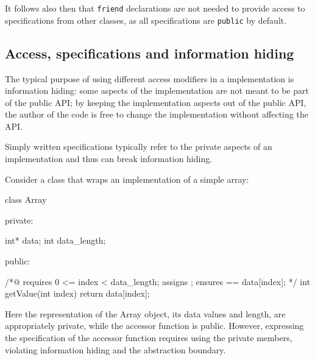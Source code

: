 It follows also then that \lstinline|friend| declarations are not 
needed to provide access to \NAME specifications from other classes,
as all specifications are \lstinline|public| by default.
 
\subsection{Access, specifications and information hiding}

The typical purpose of using different access modifiers in a
\lang implementation is information hiding: some aspects of
the implementation are not meant to be part of the public API;
by keeping the implementation aspects out of the public API, the
author of the code is free to change the implementation without
affecting the API.

Simply written specifications typically refer to the private
aspects of an implementation and thus can break information hiding.

%
Consider a class that wraps an implementation of a simple array:

\begin{listing-nonumber}
class Array {
	
  private:
	
	int* data;
	int data_length;

  public:
	
	/*@ 
	requires 0 <= index < data_length;
	assigns \nothing;
	ensures \result == data[index];
	*/
	int getValue(int index) {
		return data[index];
	}
}
\end{listing-nonumber}

Here the representation of the Array object, its data values and length, are appropriately private, while the accessor function is public.
However, expressing the specification of the accessor function requires using the private members, violating information hiding and
the abstraction boundary.

